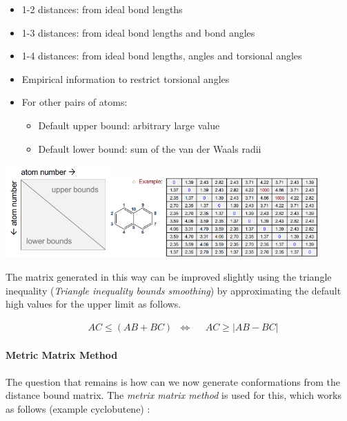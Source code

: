 \begin{itemize}
    \item 1-2 distances: from ideal bond lengths
    \item 1-3 distances: from ideal bond lengths and bond angles
    \item 1-4 distances: from ideal bond lengths, angles and torsional angles
    \item Empirical information to restrict torsional angles
    \item For other pairs of atoms:
    \begin{itemize}
        \item Default upper bound: arbitrary large value
        \item Default lower bound: sum of the van der Waals radii
    \end{itemize}
\end{itemize}

\begin{center}\includegraphics[width=0.30\textwidth]{img/cheminformatics/3dInitialDistanceMatrixEmpty.png}\includegraphics[width=0.60\textwidth]{img/cheminformatics/3dInitialDistanceMatrix.png}\end{center}

The matrix generated in this way can be improved slightly using the triangle inequality (\emph{Triangle inequality bounds smoothing}) by approximating the default high values for the upper limit as follows.

\begin{align}
    &AC\leq(AB+BC)&\Leftrightarrow&&AC\geq|AB-BC|
\end{align}

\paragraph{Metric Matrix Method}
The question that remains is how can we now generate conformations from the distance bound matrix. The \emph{metrix matrix method} is used for this, which works as follows (example cyclobutene) :

